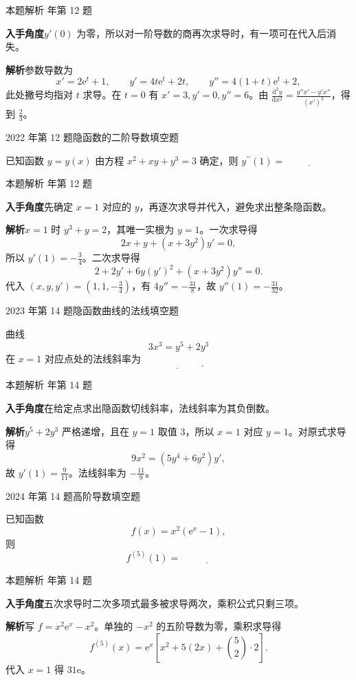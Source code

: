 \documentclass[UTF8,zihao=-4,fontset=fandol]{ctexart}
\newcommand{\blank}{\underline{\hspace{5em}}}
\newcommand{\QuestionPage}[6]{%
  \par\noindent\begin{minipage}{\linewidth}
  \raggedright
  {\small\textcolor{black!60}{#3\quad #5}\hfill\textcolor{accent}{#2}}\par\smallskip}
\newcommand{\QuestionEnd}{\end{minipage}\par\medskip}
\newcommand{\QuestionPage}[6]{%
  \clearpage
  {\small\textcolor{accent}{#1\hfill #2}}\par\medskip
  {\small\textcolor{black!60}{#3\quad #5\hfill #6}}\par\vspace{9bp}}
\newcommand{\QuestionEnd}{}
\newenvironment{QuestionSolution}[1]{%
  \clearpage
  {\small\textcolor{black!60}{本题解析\quad #1}}\par\medskip
}{\par\clearpage}
\begin{document}
\begin{QuestionSolution}{2021 年第 12 题}
\textbf{入手角度}\quad \(y'(0)\) 为零，所以对一阶导数的商再次求导时，有一项可在代入后消失。

\textbf{解析}\quad 参数导数为
\[
x'=2\mathrm{e}^t+1,\qquad y'=4t\mathrm{e}^t+2t,\qquad y''=4(1+t)\mathrm{e}^t+2,
\]
此处撇号均指对 \(t\) 求导。在 \(t=0\) 有 \(x'=3,y'=0,y''=6\)。由 \(\frac{\mathrm{d}^2y}{\mathrm{d}x^2}=\frac{y''x'-y'x''}{(x')^3}\)，得到 \(\boxed{\frac{2}{3}}\)。
\end{QuestionSolution}

\QuestionPage{2.2 求导的基本法则}{填空题}{2022 年第 12 题}{2}{隐函数的二阶导数}{078 / 234}
已知函数 \(y = y\left( x \right)\) 由方程
\(x^{2} + xy + y^{3} = 3\)
确定，则 \(y^{\prime\prime}\left( 1 \right) = \blank{}\)
\QuestionEnd

\begin{QuestionSolution}{2022 年第 12 题}
\textbf{入手角度}\quad 先确定 \(x=1\) 对应的 \(y\)，再逐次求导并代入，避免求出整条隐函数。

\textbf{解析}\quad \(x=1\) 时 \(y^3+y=2\)，其唯一实根为 \(y=1\)。一次求导得
\[
2x+y+(x+3y^2)y'=0,
\]
所以 \(y'(1)=-\frac{3}{4}\)。二次求导得
\[
2+2y'+6y(y')^2+(x+3y^2)y''=0.
\]
代入 \((x,y,y')=(1,1,-\frac{3}{4})\)，有 \(4y''=-\frac{31}{8}\)，故 \(\boxed{y''(1)=-\frac{31}{32}}\)。
\end{QuestionSolution}

\QuestionPage{2.2 求导的基本法则}{填空题}{2023 年第 14 题}{2}{隐函数曲线的法线}{079 / 234}
曲线
\[3x^3=y^5+2y^3
\]
在 \(x=1\) 对应点处的法线斜率为
\[\blank{}.
\]
\QuestionEnd

\begin{QuestionSolution}{2023 年第 14 题}
\textbf{入手角度}\quad 在给定点求出隐函数切线斜率，法线斜率为其负倒数。

\textbf{解析}\quad \(y^5+2y^3\) 严格递增，且在 \(y=1\) 取值 \(3\)，所以 \(x=1\) 对应 \(y=1\)。对原式求导得
\[
9x^2=(5y^4+6y^2)y',
\]
故 \(y'(1)=\frac{9}{11}\)。法线斜率为 \(\boxed{-\frac{11}{9}}\)。
\end{QuestionSolution}

\QuestionPage{2.2 求导的基本法则}{填空题}{2024 年第 14 题}{2}{高阶导数}{080 / 234}
已知函数
\[f(x)=x^2(\mathrm{e}^x-1),
\]
则
\[f^{(5)}(1)=\ \blank{}
\]
\QuestionEnd

\begin{QuestionSolution}{2024 年第 14 题}
\textbf{入手角度}\quad 五次求导时二次多项式最多被求导两次，乘积公式只剩三项。

\textbf{解析}\quad 写 \(f=x^2\mathrm{e}^x-x^2\)。单独的 \(-x^2\) 的五阶导数为零，乘积求导得
\[
f^{(5)}(x)=\mathrm{e}^x\left[x^2+5(2x)+\binom52\cdot2\right].
\]
代入 \(x=1\) 得 \(\boxed{31\mathrm{e}}\)。
\end{QuestionSolution}
\end{document}
